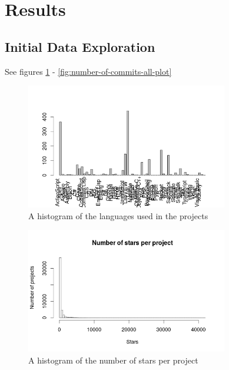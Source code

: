 \section{Results}
    \subsection{Initial Data Exploration}
    	See figures \ref{fig:language-frequency-plot} - \ref{fig:number-of-commits-all-plot}
	    \begin{figure}
	        \includegraphics[width=250pt]{figures/language-frequency}
	        \caption{A histogram of the languages used in the projects}
	        \label{fig:language-frequency-plot}
	    \end{figure}

	    
	    \begin{figure}
	        \includegraphics[width=250pt]{figures/star-distribution}
	        \caption{A histogram of the  number of stars per project}
	        \label{fig:star-distribution-plot}
	    \end{figure}
	    
